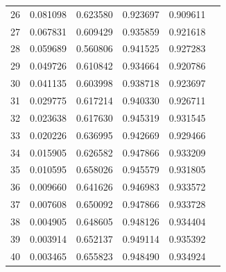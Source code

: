 \begin{table}[ht]
{\begin{tabular}{c c c c c c}
26 & 0.081098 & 0.623580 & 0.923697 & 0.909611 \\
27 & 0.067831 & 0.609429 & 0.935859 & 0.921618 \\
28 & 0.059689 & 0.560806 & 0.941525 & 0.927283 \\
29 & 0.049726 & 0.610842 & 0.934664 & 0.920786 \\
30 & 0.041135 & 0.603998 & 0.938718 & 0.923697 \\
31 & 0.029775 & 0.617214 & 0.940330 & 0.926711 \\
32 & 0.023638 & 0.617630 & 0.945319 & 0.931545 \\
33 & 0.020226 & 0.636995 & 0.942669 & 0.929466 \\
34 & 0.015905 & 0.626582 & 0.947866 & 0.933209 \\
35 & 0.010595 & 0.658026 & 0.945579 & 0.931805 \\
36 & 0.009660 & 0.641626 & 0.946983 & 0.933572 \\
37 & 0.007608 & 0.650092 & 0.947866 & 0.933728 \\
38 & 0.004905 & 0.648605 & 0.948126 & 0.934404 \\
39 & 0.003914 & 0.652137 & 0.949114 & 0.935392 \\
40 & 0.003465 & 0.655823 & 0.948490 & 0.934924 \\
\hline
\end{tabular}
}
\end{table}




